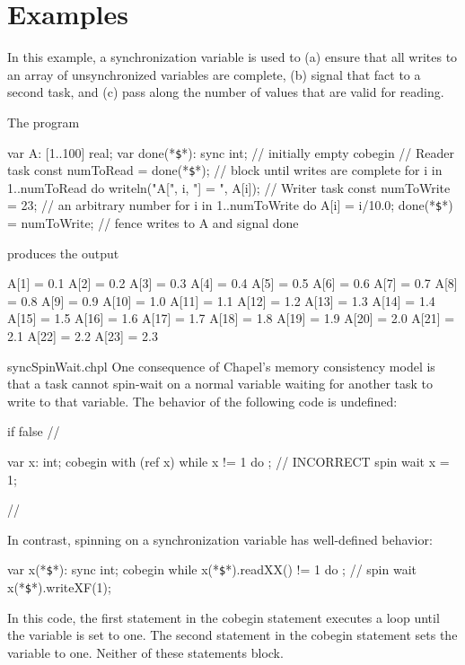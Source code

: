 \section{Examples}
\begin{example}
  In this example, a synchronization variable is used to (a) ensure that
  all writes to an array of unsynchronized variables are complete, (b)
  signal that fact to a second task, and (c) pass along the number of
  values that are valid for reading.

  The program
\begin{chapel}
var A: [1..100] real;
var done(*\texttt{\$}*): sync int;           // initially empty
cobegin {
  { // Reader task
    const numToRead = done(*\texttt{\$}*);   // block until writes are complete
    for i in 1..numToRead do
      writeln("A[", i, "] = ", A[i]);
  }
  {  // Writer task
    const numToWrite = 23;     // an arbitrary number
    for i in 1..numToWrite do
      A[i] = i/10.0;
    done(*\texttt{\$}*) = numToWrite;        // fence writes to A and signal done
  }
}
\end{chapel}
  produces the output
\begin{chapelprintoutput}{}
A[1] = 0.1
A[2] = 0.2
A[3] = 0.3
A[4] = 0.4
A[5] = 0.5
A[6] = 0.6
A[7] = 0.7
A[8] = 0.8
A[9] = 0.9
A[10] = 1.0
A[11] = 1.1
A[12] = 1.2
A[13] = 1.3
A[14] = 1.4
A[15] = 1.5
A[16] = 1.6
A[17] = 1.7
A[18] = 1.8
A[19] = 1.9
A[20] = 2.0
A[21] = 2.1
A[22] = 2.2
A[23] = 2.3
\end{chapelprintoutput}
\end{example}


\begin{chapelexample}{syncSpinWait.chpl}
One consequence of Chapel's memory consistency model is that a task cannot spin-wait on a
normal variable waiting for another task to write to that variable.  The behavior of
the following code is undefined:

\begin{chapelpre}
if false { // }
\end{chapelpre}
\begin{chapel}
var x: int;
cobegin with (ref x) {
  while x != 1 do ;  // INCORRECT spin wait
  x = 1;
}
\end{chapel}
\begin{chapelnoprint}
// {
}
\end{chapelnoprint}
In contrast, spinning on a synchronization variable has well-defined
behavior:
\begin{chapel}
var x(*\texttt{\$}*): sync int;
cobegin {
  while x(*\texttt{\$}*).readXX() != 1 do ;  // spin wait
  x(*\texttt{\$}*).writeXF(1);
}
\end{chapel}
\begin{chapeloutput}
\end{chapeloutput}

In this code, the first statement in the cobegin statement executes a
loop until the variable is set to one.  The second statement in the
cobegin statement sets the variable to one.  Neither of these
statements block.
\end{chapelexample}

